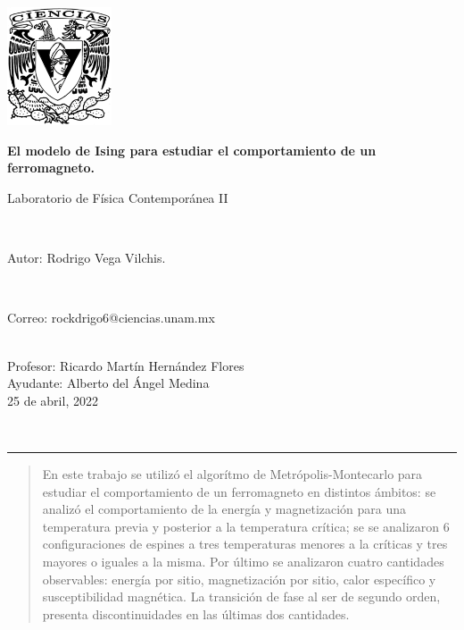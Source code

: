 \documentclass[11pt,a4paper]{article}
\begin{document}
\thispagestyle{empty}
\includegraphics[height=3.5cm]{escudoCiencias.pdf}
\vspace{-3.8cm}
\begin{flushright}
\hspace{4cm}
{\Large\textbf{El modelo de Ising para estudiar el comportamiento de un ferromagneto.}\vspace{0.2cm}

Laboratorio de Física Contemporánea II}
\vspace{0.3cm}\\
\begin{large}Autor: Rodrigo Vega Vilchis.\end{large}\\
\begin{footnotesize}
Correo: rockdrigo6@ciencias.unam.mx\\
\\
\end{footnotesize}
\vspace{0.1cm}
\begin{large}Profesor: Ricardo Martín Hernández Flores\\
Ayudante: Alberto del Ángel Medina\\
25 de abril, 2022\end{large}\\
\end{flushright}
 \hrule height1pt\vspace{.5cm}
\begin{abstract}
En este trabajo se utilizó el algorítmo de Metrópolis-Montecarlo para estudiar el comportamiento de un ferromagneto en distintos ámbitos: se analizó el comportamiento de la energía y magnetización para una temperatura previa y posterior a la temperatura crítica; se se analizaron 6 configuraciones de espines a tres temperaturas menores a la críticas y tres mayores o iguales a la misma. Por último se analizaron cuatro cantidades observables: energía por sitio, magnetización por sitio, calor específico y susceptibilidad magnética. La transición de fase al ser de segundo orden, presenta discontinuidades en las últimas dos cantidades.
\end{abstract}
\end{document}

